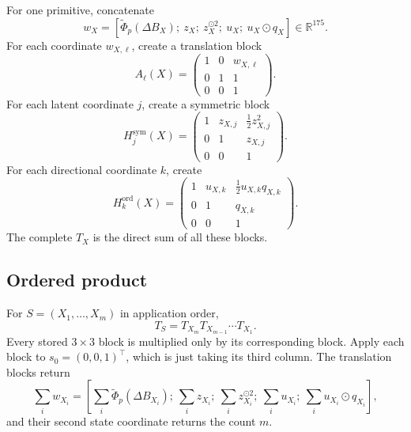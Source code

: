 \documentclass[11pt,a4paper]{article}
\newcommand{\R}{\mathbb{R}}
\newcommand{\od}{\odot}
\newcommand{\dB}{\Delta B}
\begin{document}
For one primitive, concatenate
\begin{equation}
w_X=\left[
\widetilde\Phi_p(\dB_X);\ z_X;\ z_X^{\od2};\ u_X;\ u_X\od q_X
\right]\in\R^{175}.
\label{eq:w}
\end{equation}
For each coordinate $w_{X,\ell}$, create a translation block
\begin{equation}
A_\ell(X)=
\begin{pmatrix}
1&0&w_{X,\ell}\\
0&1&1\\
0&0&1
\end{pmatrix}.
\end{equation}
For each latent coordinate $j$, create a symmetric block
\begin{equation}
H_j^{\mathrm{sym}}(X)=
\begin{pmatrix}
1&z_{X,j}&\tfrac12 z_{X,j}^2\\
0&1&z_{X,j}\\
0&0&1
\end{pmatrix}.
\end{equation}
For each directional coordinate $k$, create
\begin{equation}
H_k^{\mathrm{ord}}(X)=
\begin{pmatrix}
1&u_{X,k}&\tfrac12u_{X,k}q_{X,k}\\
0&1&q_{X,k}\\
0&0&1
\end{pmatrix}.
\end{equation}
The complete $T_X$ is the direct sum of all these blocks.

\subsection{Ordered product}

For $S=(X_1,\ldots,X_m)$ in application order,
\begin{equation}
\boxed{T_S=T_{X_m}T_{X_{m-1}}\cdots T_{X_1}.}
\label{eq:orderedprod}
\end{equation}
Every stored $3\times3$ block is multiplied only by its corresponding block.
Apply each block to $s_0=(0,0,1)^\top$, which is just taking its third column.
The translation blocks return
\begin{equation}
\sum_iw_{X_i}
=\left[
\sum_i\widetilde\Phi_p(\dB_{X_i});\
\sum_i z_{X_i};\
\sum_i z_{X_i}^{\od2};\
\sum_i u_{X_i};\
\sum_i u_{X_i}\od q_{X_i}
\right],
\end{equation}
and their second state coordinate returns the count $m$.
\end{document}
